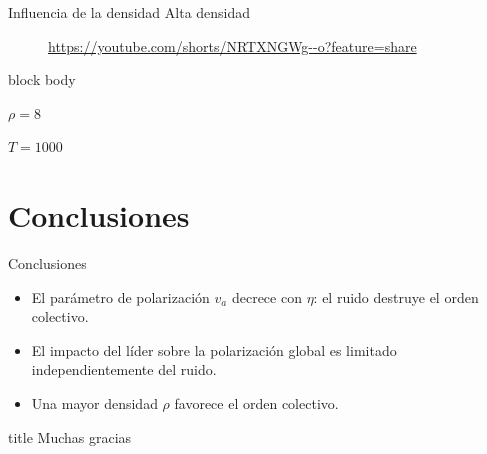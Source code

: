 \documentclass{beamer}
\begin{document}
\begin{frame}{Influencia de la densidad}
    \centering
    Alta densidad
    \begin{figure}[H!]
    \caption*{\url{https://youtube.com/shorts/tatwWGUWL3w?feature=share}}
    \caption*{\url{https://youtube.com/shorts/NRTXNGWg--o?feature=share}}
    \end{figure}

    \begin{beamercolorbox}[sep=2pt,center]{block body}
        \begin{minipage}[t]{0.2\textwidth}
            \centering
            \small{$\rho=8$}
        \end{minipage}
        \hfill
        \begin{minipage}[t]{0.3\textwidth}
            \centering
            \small{$T=1000$}
        \end{minipage}
    \end{beamercolorbox}
\end{frame}

\section{Conclusiones}
\begin{frame}{Conclusiones}
    \begin{itemize}
        \item El parámetro de polarización $v_a$ decrece con $\eta$: el ruido destruye el orden colectivo.
        \item El impacto del líder sobre la polarización global es limitado independientemente del ruido.
        \item Una mayor densidad $\rho$ favorece el orden colectivo.
    \end{itemize}
\end{frame}

\begin{frame}
    \begin{beamercolorbox}[sep=8pt,center]{title}
         Muchas gracias
    \end{beamercolorbox}
\end{frame}
\end{document}
